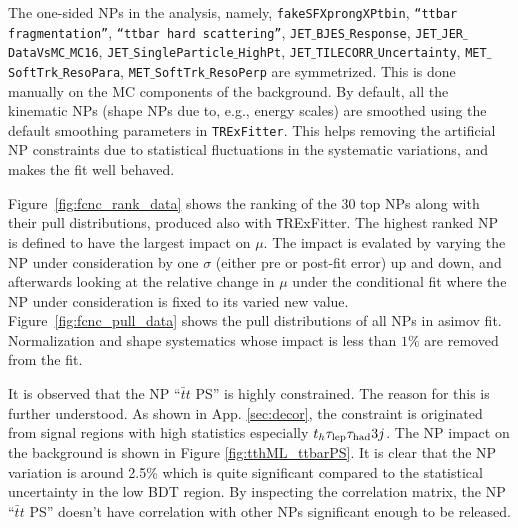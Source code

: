 The one-sided NPs in the analysis, namely, \texttt{fakeSFXprongXPtbin}, \texttt{``ttbar fragmentation''}, \texttt{``ttbar hard scattering''}, \texttt{JET$\_$BJES$\_$Response}, \texttt{JET$\_$JER$\_$DataVsMC$\_$MC16}, \texttt{JET$\_$SingleParticle$\_$HighPt}, \texttt{JET$\_$TILECORR$\_$Uncertainty}, \texttt{MET$\_$SoftTrk$\_$ResoPara}, \texttt{MET$\_$SoftTrk$\_$ResoPerp} are symmetrized. This is done manually on the MC components of the background. By default, all the kinematic NPs (shape NPs due to, e.g., energy scales) are smoothed using the default smoothing parameters in \texttt{TRExFitter}. This helps removing the artificial NP constraints due to statistical fluctuations in the systematic variations, and makes the fit well behaved. %

Figure~\ref{fig:fcnc_rank_data} shows the ranking of the 30 top NPs along with their pull distributions, produced also with {\texttt TRExFitter}. The highest ranked NP is defined to have the largest impact on $\mu$. The impact is evalated by varying the NP under consideration by one $\sigma$ (either pre or post-fit error) up and down, and afterwards looking at the relative change in $\mu$ under the conditional fit where the NP under consideration is fixed to its varied new value.
Figure~\ref{fig:fcnc_pull_data} shows the pull distributions of all NPs in asimov fit. %
Normalization and shape systematics whose impact is less than $1\%$ are removed from the fit. %

It is observed that the NP ``$\bar{t}t$ PS'' is highly constrained. The reason for this is further understood. As shown in App. \ref{sec:decor}, the constraint is originated from signal regions with high statistics especially $t_h\tau_\text{lep}{}\tau_\text{had} 3j$. The NP impact on the background is shown in Figure \ref{fig:tthML_ttbarPS}. It is clear that the NP variation is around 2.5\% which is quite significant compared to the statistical uncertainty in the low BDT region. By inspecting the correlation matrix, the NP ``$\bar{t}t$ PS'' doesn't have correlation with other NPs significant enough to be released.


